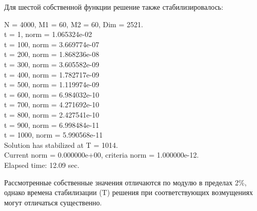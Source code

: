 \documentclass[12pt,a4paper]{article}
\begin{document}
Для шестой собственной функции решение также стабилизировалось:
\begin{center}
N = 4000, M1 =  60, M2 =  60, Dim =   2521.                      \\
t =   1, norm = 1.065324e-02                                     \\
t = 100, norm = 3.669774e-07                                     \\
t = 200, norm = 1.868236e-08                                     \\
t = 300, norm = 3.605582e-09                                     \\
t = 400, norm = 1.782717e-09                                     \\
t = 500, norm = 1.119974e-09                                     \\
t = 600, norm = 6.984032e-10                                     \\
t = 700, norm = 4.271692e-10                                     \\
t = 800, norm = 2.427541e-10                                     \\
t = 900, norm = 6.998484e-11                                     \\
t = 1000, norm = 5.990568e-11                                    \\
Solution has stabilized at T = 1014.                             \\
Current norm = 0.000000e+00, criteria norm = 1.000000e-12.       \\
Elapsed time: 12.09 sec.
\end{center}

Рассмотренные собственные значения отличаются по модулю в пределах 2\%, однако времена стабилизации (T) решения при соответствующих возмущениях могут отличаться существенно.
\end{document}
